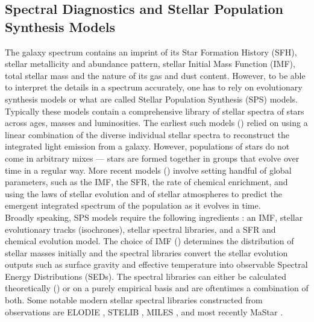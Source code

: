 \subsection{Spectral Diagnostics and Stellar Population Synthesis Models}
\label{sed}

The galaxy spectrum contains an imprint of its Star Formation History (SFH), stellar metallicity and abundance pattern, stellar Initial Mass Function (IMF), total stellar mass and the nature of its gas and dust content. However, to be able to interpret the details in a spectrum accurately, one has to rely on evolutionary synthesis models or what are called Stellar Population Synthesis (SPS) models. Typically these models contain a comprehensive library of stellar spectra of stars across ages, masses and luminosities. The earliest such models (\citealt{1971ApJS...22..445S, 1972AandA....20..361F}) relied on using a linear combination of the diverse individual stellar spectra to reconstruct the integrated light emission from a galaxy. However,
populations of stars do not come in arbitrary mixes --- stars are formed
together in groups that evolve over time in a regular way. More 
recent models (\citealt{1995ApJS...96....9L, 2002AandA...392....1S, bruzual_stellar_2003}) involve setting handful of global parameters,
such as the IMF, the SFR, the rate of chemical enrichment, and 
using the laws of stellar evolution and of stellar atmospheres to 
predict the emergent integrated spectrum of the population
as it evolves in time.\\

Broadly speaking, SPS models require the following ingredients \citep{2011ApandSS.331....1W}: an IMF, stellar evolutionary tracks (isochrones), stellar spectral libraries, and a SFR 
and chemical evolution model.
The choice of IMF (\citealt{1955ApJ...121..161S, 2001MNRAS.322..231K, 2003PASP..115..763C}) determines the distribution of stellar masses initially and the spectral libraries convert the stellar evolution outputs such as surface gravity and effective temperature into observable Spectral Energy Distributions (SEDs). The spectral libraries 
can either be calculated theoretically (\citealt{2005AandA...443..735C, 2005AandA...436.1049M}) or on a purely empirical basis and are oftentimes a combination of both. Some notable modern stellar spectral libraries constructed from observations are ELODIE \citep{2004astro.ph..9214P}, STELIB \citep{2003AandA...402..433L}, MILES \citep{2006MNRAS.371..703S}, 
and most recently MaStar \citep{yan19a}.

